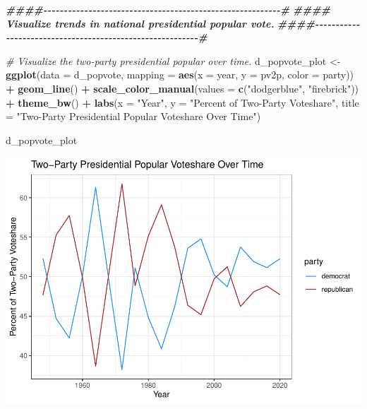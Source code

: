 \documentclass[
]{article}
\newenvironment{Shaded}{\begin{snugshade}}{\end{snugshade}}
\newcommand{\AttributeTok}[1]{\textcolor[rgb]{0.13,0.29,0.53}{#1}}
\newcommand{\CommentTok}[1]{\textcolor[rgb]{0.56,0.35,0.01}{\textit{#1}}}
\newcommand{\DocumentationTok}[1]{\textcolor[rgb]{0.56,0.35,0.01}{\textbf{\textit{#1}}}}
\newcommand{\FunctionTok}[1]{\textcolor[rgb]{0.13,0.29,0.53}{\textbf{#1}}}
\newcommand{\NormalTok}[1]{#1}
\newcommand{\OtherTok}[1]{\textcolor[rgb]{0.56,0.35,0.01}{#1}}
\newcommand{\SpecialCharTok}[1]{\textcolor[rgb]{0.81,0.36,0.00}{\textbf{#1}}}
\newcommand{\StringTok}[1]{\textcolor[rgb]{0.31,0.60,0.02}{#1}}
\begin{document}
\begin{Shaded}
\begin{Highlighting}[]
\DocumentationTok{\#\#\#\#{-}{-}{-}{-}{-}{-}{-}{-}{-}{-}{-}{-}{-}{-}{-}{-}{-}{-}{-}{-}{-}{-}{-}{-}{-}{-}{-}{-}{-}{-}{-}{-}{-}{-}{-}{-}{-}{-}{-}{-}{-}{-}{-}{-}{-}{-}{-}{-}{-}{-}{-}{-}{-}{-}{-}{-}{-}{-}\#}
\DocumentationTok{\#\#\#\# Visualize trends in national presidential popular vote. }
\DocumentationTok{\#\#\#\#{-}{-}{-}{-}{-}{-}{-}{-}{-}{-}{-}{-}{-}{-}{-}{-}{-}{-}{-}{-}{-}{-}{-}{-}{-}{-}{-}{-}{-}{-}{-}{-}{-}{-}{-}{-}{-}{-}{-}{-}{-}{-}{-}{-}{-}{-}{-}{-}{-}{-}{-}{-}{-}{-}{-}{-}{-}{-}\#}

\CommentTok{\# Visualize the two{-}party presidential popular over time. }
\NormalTok{d\_popvote\_plot }\OtherTok{\textless{}{-}} \FunctionTok{ggplot}\NormalTok{(}\AttributeTok{data =}\NormalTok{ d\_popvote,}
                         \AttributeTok{mapping =} \FunctionTok{aes}\NormalTok{(}\AttributeTok{x =}\NormalTok{ year, }\AttributeTok{y =}\NormalTok{ pv2p, }\AttributeTok{color =}\NormalTok{ party)) }\SpecialCharTok{+} 
  \FunctionTok{geom\_line}\NormalTok{() }\SpecialCharTok{+}
  \FunctionTok{scale\_color\_manual}\NormalTok{(}\AttributeTok{values =} \FunctionTok{c}\NormalTok{(}\StringTok{"dodgerblue"}\NormalTok{, }\StringTok{"firebrick"}\NormalTok{)) }\SpecialCharTok{+}
  \FunctionTok{theme\_bw}\NormalTok{() }\SpecialCharTok{+}
  \FunctionTok{labs}\NormalTok{(}\AttributeTok{x =} \StringTok{"Year"}\NormalTok{,}
       \AttributeTok{y =} \StringTok{"Percent of Two{-}Party Voteshare"}\NormalTok{,}
       \AttributeTok{title =} \StringTok{"Two{-}Party Presidential Popular Voteshare Over Time"}\NormalTok{)}

\NormalTok{d\_popvote\_plot}
\end{Highlighting}
\end{Shaded}

\includegraphics{Lab1-notes_files/figure-latex/unnamed-chunk-1-1.pdf}
\end{document}
